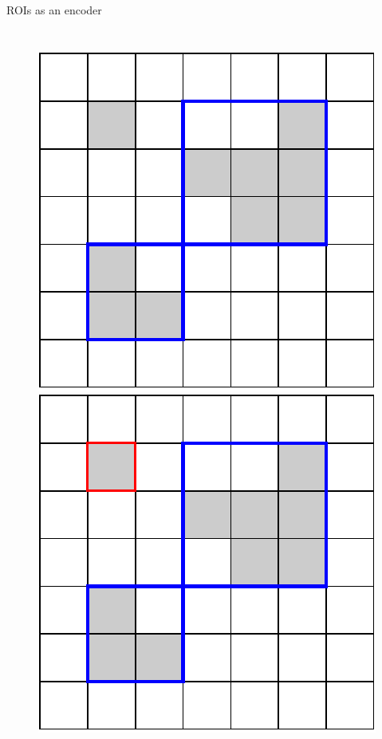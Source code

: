 \documentclass[10pt]{beamer}
\begin{document}
\begin{frame}{ROIs as an encoder}
\begin{columns}[T, onlytextwidth]
    \begin{figure}
        \begin{overprint}
            \centering\includegraphics[scale=0.5]{figures/running-example/ILP/running-ex-ilp1.pdf}
            \centering\includegraphics[scale=0.5]{figures/running-example/ILP/running-ex-ilp2.pdf}

\end{overprint}
\end{figure}
\end{columns}
\end{frame}
\end{document}
